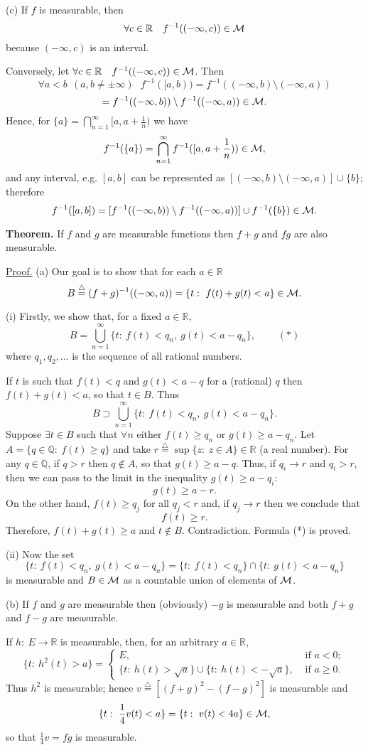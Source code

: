\documentclass[a4paper,10pt]{article}
\def\RR{\mathbb{R}}
\def\QQ{\mathbb{Q}}
\newcommand{\1}[1]{\mathbf{1}_{\{#1\}}}
\newcommand{\defi}{\stackrel{\triangle}{=}}
\begin{document}
(c) If $f$ is measurable, then
  $$\forall c\in\RR~~~f^{-1}((-\infty,c))\in{\cal M}$$
because $(-\infty,c)$ is an interval.

Conversely, let $\forall c\in\RR~~~f^{-1}((-\infty,c))\in{\cal M}$. Then
  $$\forall a<b~~(a,b\ne\pm\infty)~~~f^{-1}([a,b))=f^{-1}((-\infty,b)\setminus(-\infty,a))$$
    $$=f^{-1}((-\infty,b))\setminus f^{-1}((-\infty,a))\in{\cal M}.$$
Hence, for $\{a\}=\bigcap_{n=1}^\infty [a,a+\frac{1}{n})$ we have
  $$f^{-1}(\{a\})=\bigcap_{n=1}^\infty f^{-1}([a,a+\frac{1}{n}))\in{\cal M},$$
and any interval, e.g. $[a,b]$ can be represented as $[(-\infty,b)\setminus(-\infty,a)]\cup\{b\}$; therefore
  $$f^{-1}([a,b])=[f^{-1}((-\infty,b))\setminus f^{-1}((-\infty,a))]\cup f^{-1}(\{b\})\in{\cal M}.$$
\blacksquare \vspace{3mm}

{\bf Theorem.} If $f$ and $g$ are measurable functions then $f+g$ and $fg$ are also measurable.\vspace{3mm}

\underline{Proof.} (a) Our goal is to show that for each $a\in\RR$
  $$B\defi (f+g)^{-1}((-\infty,a))=\{t:~f(t)+g(t)<a\}\in{\cal M}.$$

(i) Firstly, we show that, for a fixed $a\in\RR$,
  $$B=\bigcup_{n=1}^\infty\{t:~f(t)<q_n,~g(t)<a-q_n\},~~~~~~~~~~(*)$$
where $q_1,q_2,\ldots$ is the sequence of all rational numbers.

If $t$ is such that $f(t)<q$ and $g(t)<a-q$ for a (rational) $q$ then $f(t)+g(t)<a$, so that $t\in B$. Thus
  $$B\supset \bigcup_{n=1}^\infty \{t:~f(t)<q_n,~g(t)<a-q_n\}.$$
Suppose $\exists t\in B$ such that $\forall n$ either $f(t)\ge q_n$ or $g(t)\ge a-q_n$. Let $A=\{q\in\QQ:~ f(t)\ge q\}$ and take $r\defi\sup\{z:~z\in A\}\in\RR$ (a real number). For any $q\in\QQ$, if $q>r$ then $q\notin A$, so that $g(t)\ge a-q$. Thus, if $q_i\to r$ and $q_i>r$, then we can pass to the limit in the inequality $g(t)\ge a-q_i$:
  $$g(t)\ge a-r.$$
On the other hand, $f(t)\ge q_j$ for all $q_j<r$ and, if $q_j\to r$ then we conclude that
  $$f(t)\ge r.$$
Therefore, $f(t)+g(t)\ge a$ and $t\notin B$. Contradiction. Formula (*) is proved.

(ii) Now the set
  $$\{t:~f(t)<q_n,~g(t)<a-q_n\}=\{t:~ f(t)<q_n\}\cap\{t:~ g(t)<a-q_n\}$$
is measurable and $B\in{\cal M}$ as a countable union of elements of $\cal M$.

(b) If $f$ and $g$ are measurable then (obviously) $-g$ is measurable and both $f+g$ and $f-g$ are measurable.

If $h:~E\to\RR$ is  measurable, then, for an arbitrary $a\in\RR$,
  $$\{t:~h^2(t)>a\}=\left\{\begin{array}{ll}
E, & \mbox{ if } a<0; \\ \{t:~h(t)>\sqrt{a}\}\cup\{t:~h(t)<-\sqrt{a}\}, &\mbox{ if } a\ge 0. \end{array}\right. $$
Thus $h^2$ is measurable; hence $v\defi[(f+g)^2-(f-g)^2]$ is measurable and
  $$\{t:~\frac{1}{4}v(t)<a\}=\{t:~ v(t)<4a\}\in{\cal M},$$
so that $\frac{1}{4}v=fg$ is measurable. \blacksquare \vspace{3mm}
\end{document}
